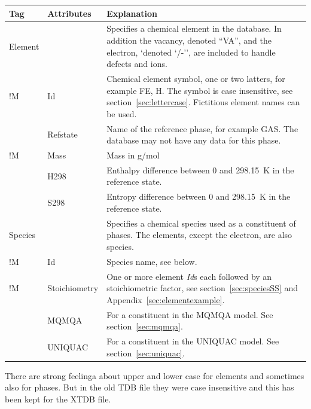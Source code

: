 \documentclass{article}
\begin{document}
\begin{tabular}{|p{} p{} p{}|}\hline
  Tag & Attributes & Explanation\\\hline

  Element & & Specifies a chemical element in the database.  In addition
              the vacancy, denoted ``VA'', and the electron, `denoted `/-'',
              are included to handle defects and ions.\\
!M        & Id   &  Chemical element symbol, one or two latters, 
                    for example FE, H.  The symbol is case insensitive,
                    see section~\ref{sec:lettercase}.
                    Fictitious element names can be used. \\
          & Refstate  &  Name of the reference  phase, for example GAS.  The
                         database may not have any data for this phase. \\
!M        & Mass   &  Mass in g/mol\\
          & H298   &  Enthalpy difference between 0 and 298.15~K 
                      in the reference state.\\
          & S298    &  Entropy difference between 0 and 298.15~K in 
                       the reference state.\\\hline

  Species & & Specifies a chemical species used as a constituent of phases.  
              The elements, except the electron, are also species.\\
!M        & Id        & Species name, see below.\\
!M        & Stoichiometry & One or more element {\em Id}s each followed by 
                        an stoichiometric factor, 
                        see section~\ref{sec:speciesSS} and
                        Appendix~\ref{sec:elementexample}.\\
          & MQMQA     & For a constituent in the MQMQA model.  See 
                        section~\ref{sec:mqmqa}.\\
          & UNIQUAC   & For a constituent in the UNIQUAC model. See 
                        section~\ref{sec:uniquac}.\\\hline

\end{tabular}

There are strong feelinga about upper and lower case for elements and
sometimes also for phases.  But in the old TDB file they were case
insensitive and this has been kept for the XTDB file.
\end{document}
